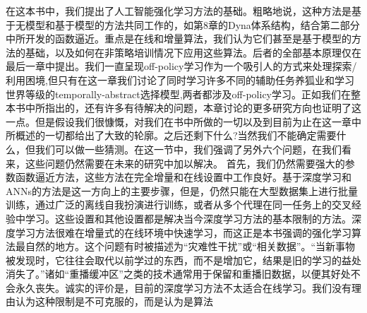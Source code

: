 在这本书中，我们提出了人工智能强化学习方法的基础。粗略地说，这种方法是基于无模型和基于模型的方法共同工作的，如第8章的Dyna体系结构，结合第二部分中所开发的函数逼近。重点是在线和增量算法，我们认为它们甚至是基于模型的方法的基础，以及如何在非策略培训情况下应用这些算法。后者的全部基本原理仅在最后一章中提出。我们一直呈现off-policy学习作为一个吸引人的方式来处理探索/利用困境,但只有在这一章我们讨论了同时学习许多不同的辅助任务养狐业和学习世界等级的temporally-abstract选择模型,两者都涉及off-policy学习。正如我们在整本书中所指出的，还有许多有待解决的问题，本章讨论的更多研究方向也证明了这一点。但是假设我们很慷慨，对我们在书中所做的一切以及到目前为止在这一章中所概述的一切都给出了大致的轮廓。之后还剩下什么?当然我们不能确定需要什么，但我们可以做一些猜测。在这一节中，我们强调了另外六个问题，在我们看来，这些问题仍然需要在未来的研究中加以解决。
首先，我们仍然需要强大的参数函数逼近方法，这些方法在完全增量和在线设置中工作良好。基于深度学习和ANNs的方法是这一方向上的主要步骤，但是，仍然只能在大型数据集上进行批量训练，通过广泛的离线自我扮演进行训练，或者从多个代理在同一任务上的交叉经验中学习。这些设置和其他设置都是解决当今深度学习方法的基本限制的方法。深度学习方法很难在增量式的在线环境中快速学习，而这正是本书强调的强化学习算法最自然的地方。这个问题有时被描述为“灾难性干扰”或“相关数据”。“当新事物被发现时，它往往会取代以前学过的东西，而不是增加它，结果是旧的学习的益处消失了。”诸如“重播缓冲区”之类的技术通常用于保留和重播旧数据，以便其好处不会永久丧失。诚实的评价是，目前的深度学习方法不太适合在线学习。我们没有理由认为这种限制是不可克服的，而是认为是算法

